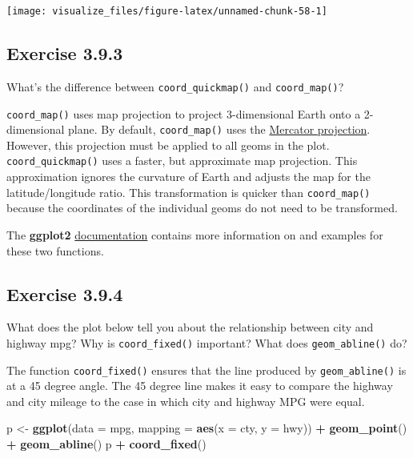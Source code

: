 \documentclass[]{book}
\newenvironment{Shaded}{\begin{snugshade}}{\end{snugshade}}
\newcommand{\DataTypeTok}[1]{\textcolor[rgb]{0.13,0.29,0.53}{#1}}
\newcommand{\KeywordTok}[1]{\textcolor[rgb]{0.13,0.29,0.53}{\textbf{#1}}}
\newcommand{\NormalTok}[1]{#1}
\newcommand{\OperatorTok}[1]{\textcolor[rgb]{0.81,0.36,0.00}{\textbf{#1}}}
\newcommand{\StringTok}[1]{\textcolor[rgb]{0.31,0.60,0.02}{#1}}
\theoremstyle{plain}
\theoremstyle{remark}
\begin{document}
\begin{center}\texttt{[image: visualize\_files/figure-latex/unnamed-chunk-58-1]} \end{center}

\hypertarget{exercise-3.9.3}{%
\subsection*{\texorpdfstring{Exercise
{3.9.3}}{Exercise 3.9.3}}\label{exercise-3.9.3}}

What's the difference between \texttt{coord\_quickmap()} and
\texttt{coord\_map()}?

\texttt{coord\_map()} uses map projection to project 3-dimensional Earth
onto a 2-dimensional plane. By default, \texttt{coord\_map()} uses the
\href{https://en.wikipedia.org/wiki/Mercator_projection}{Mercator
projection}. However, this projection must be applied to all geoms in
the plot. \texttt{coord\_quickmap()} uses a faster, but approximate map
projection. This approximation ignores the curvature of Earth and
adjusts the map for the latitude/longitude ratio. This transformation is
quicker than \texttt{coord\_map()} because the coordinates of the
individual geoms do not need to be transformed.

The \textbf{ggplot2}
\href{http://docs.ggplot2.org/current/coord_map.html}{documentation}
contains more information on and examples for these two functions.

\hypertarget{exercise-3.9.4}{%
\subsection*{\texorpdfstring{Exercise
{3.9.4}}{Exercise 3.9.4}}\label{exercise-3.9.4}}

What does the plot below tell you about the relationship between city
and highway mpg? Why is \texttt{coord\_fixed()} important? What does
\texttt{geom\_abline()} do?

The function \texttt{coord\_fixed()} ensures that the line produced by
\texttt{geom\_abline()} is at a 45 degree angle. The 45 degree line
makes it easy to compare the highway and city mileage to the case in
which city and highway MPG were equal.

\begin{Shaded}
\begin{Highlighting}[]
\NormalTok{p <-}\StringTok{ }\KeywordTok{ggplot}\NormalTok{(}\DataTypeTok{data =}\NormalTok{ mpg, }\DataTypeTok{mapping =} \KeywordTok{aes}\NormalTok{(}\DataTypeTok{x =}\NormalTok{ cty, }\DataTypeTok{y =}\NormalTok{ hwy)) }\OperatorTok{+}
\StringTok{  }\KeywordTok{geom_point}\NormalTok{() }\OperatorTok{+}
\StringTok{  }\KeywordTok{geom_abline}\NormalTok{()}
\NormalTok{p }\OperatorTok{+}\StringTok{ }\KeywordTok{coord_fixed}\NormalTok{()}
\end{Highlighting}
\end{Shaded}
\end{document}
